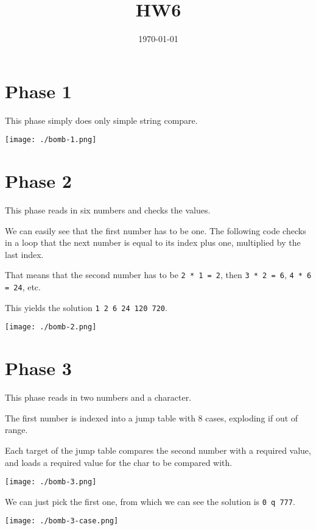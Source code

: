 \documentclass[11pt]{article}
\date{\today}
\title{HW6}
\begin{document}
\maketitle
\tableofcontents

\section{Phase 1}
\label{sec:org63362a4}
This phase simply does only simple string compare.
\begin{center}
\texttt{[image: ./bomb-1.png]}
\end{center}
\section{Phase 2}
\label{sec:org066b306}
This phase reads in six numbers and checks the values.

We can easily see that the first number has to be one. The following
code checks in a loop that the next number is equal to its index plus
one, multiplied by the last index.

That means that the second number has to be \texttt{2 * 1 = 2}, then \texttt{3 * 2 =
6}, \texttt{4 * 6 = 24}, etc.

This yields the solution \texttt{1 2 6 24 120 720}.

\begin{center}
\texttt{[image: ./bomb-2.png]}
\end{center}
\section{Phase 3}
\label{sec:org1703431}
This phase reads in two numbers and a character.

The first number is indexed into a jump table with 8 cases, exploding
if out of range.

Each target of the jump table compares the second number with a
required value, and loads a required value for the char to be compared
with.

\begin{center}
\texttt{[image: ./bomb-3.png]}
\end{center}


We can just pick the first one, from which we can see the solution is
\texttt{0 q 777}.

\begin{center}
\texttt{[image: ./bomb-3-case.png]}
\end{center}
\end{document}
